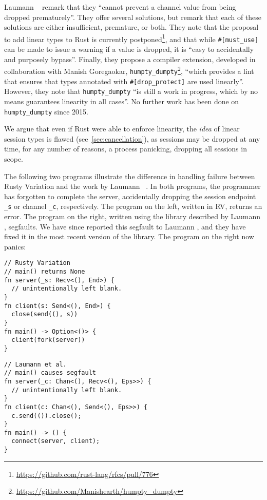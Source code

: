 \documentclass[copyright,creativecommons]{eptcs}
\begin{document}
Laumann \etal~\cite{jespersen2015} remark that they ``cannot prevent a channel value from being dropped prematurely''. They offer several solutions, but remark that each of these solutions are either insufficient, premature, or both. They note that the proposal to add linear types to Rust is currently postponed\footnote{\url{https://github.com/rust-lang/rfcs/pull/776}}, and that while \lstinline{#[must_use]} can be made to issue a warning if a value is dropped, it is ``easy to accidentally and purposely bypass''. Finally, they propose a compiler extension, developed in collaboration with Manish Goregaokar, \lstinline{humpty_dumpty}\footnote{\url{https://github.com/Manishearth/humpty_dumpty}}, ``which provides a lint that ensures that types annotated  with \lstinline{#[drop_protect]} are used linearly''. However, they note that \lstinline{humpty_dumpty} ``is still a work in progress, which by no means guarantees linearity in all cases''. No further work has been done on \lstinline{humpty_dumpty} since 2015.

We argue that even if Rust were able to enforce linearity, the \emph{idea} of linear session types is flawed (see~\cref{sec:cancellation}), as sessions may be dropped at any time, for any number of reasons, \eg a process panicking, dropping all sessions in scope.

The following two programs illustrate the difference in handling failure between Rusty Variation and the work by Laumann \etal~\cite{jespersen2015}. In both programs, the programmer has forgotten to complete the server, accidentally dropping the session endpoint \lstinline{_s} or channel \lstinline{_c}, respectively. The program on the left, written in RV, returns an error. The program on the right, written using the library described by Laumann \etal\cite{jespersen2015}, segfaults. We have since reported this segfault to Laumann \etal, and they have fixed it in the most recent version of the library. The program on the right now panics:

\vspace{-0.5\baselineskip}
\begin{minipage}[t]{0.5\linewidth}
\begin{lstlisting}
// Rusty Variation
// main() returns None
fn server(_s: Recv<(), End>) {
  // unintentionally left blank.
}
fn client(s: Send<(), End>) {
  close(send((), s))
}
fn main() -> Option<()> {
  client(fork(server))
}
\end{lstlisting}
\end{minipage}%
\begin{minipage}[t]{0.5\linewidth}
\begin{lstlisting}
// Laumann et al.
// main() causes segfault
fn server(_c: Chan<(), Recv<(), Eps>>) {
  // unintentionally left blank.
}
fn client(c: Chan<(), Send<(), Eps>>) {
  c.send(()).close();
}
fn main() -> () {
  connect(server, client);
}
\end{lstlisting}
\end{minipage}%
\end{document}

